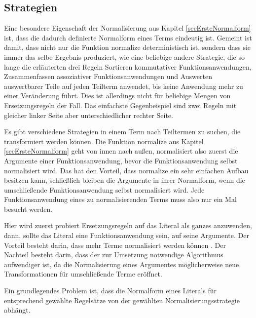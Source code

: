 \subsection{Strategien}
Eine besondere Eigenschaft der Normalisierung aus Kapitel \ref{secErsteNormalform} ist, dass die dadurch definierte Normalform eines Terms eindeutig ist. Gemeint ist damit, dass nicht nur die Funktion $\mathrm{normalize}$ deterministisch ist, sondern dass sie immer das selbe Ergebnis produziert, wie eine beliebige andere Strategie, die so lange die erläuterten drei Regeln Sortieren kommutativer Funktionsanwendungen, Zusammenfassen assoziativer Funktionsanwendungen und Auswerten auswertbarer Teile auf jeden Teilterm anwendet, bis keine Anwendung mehr zu einer Veränderung führt. Dies ist allerdings nicht für beliebige Mengen von Ersetzungsregeln der Fall. Das einfachste Gegenbeispiel sind zwei Regeln mit gleicher linker Seite aber unterschiedlicher rechter Seite.




Es gibt verschiedene Strategien in einem Term nach Teiltermen zu suchen, die transformiert werden können. Die Funktion $\mathrm{normalize}$ aus Kapitel \ref{secErsteNormalform} geht von innen nach außen, normalisiert also zuerst die Argumente einer Funktionsanwendung, bevor die Funktionsanwendung selbst normalisiert wird. Das hat den Vorteil, dass $\mathrm{normalize}$ ein sehr einfachen Aufbau besitzen kann, schließlich bleiben die Argumente in ihrer Normalform, wenn die umschließende Funktionsanwendung selbst normalisiert wird. Jede Funktionsanwendung eines zu normalisierenden Terms muss also nur ein Mal besucht werden.


Hier wird zuerst probiert Ersetzungsregeln auf das Literal als ganzes anzuwenden, dann, sollte das Literal eine Funktionsanwendung sein, auf seine Argumente. Der Vorteil besteht darin, dass mehr Terme normalisiert werden können \cite{EvalStrategien}. Der Nachteil besteht darin, dass der zur Umsetzung notwendige Algorithmus aufwendiger ist, da die Normalisierung eines Argumentes möglicherweise neue Transformationen für umschließende Terme eröffnet.

Ein grundlegendes Problem ist, dass die Normalform eines Literals für entsprechend gewählte Regelsätze von der gewählten Normalisierungsstrategie abhängt. 


















